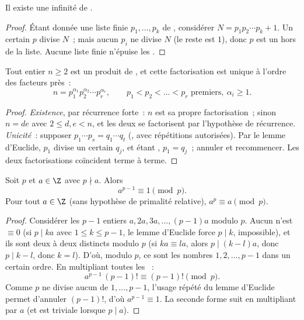 \begin{theorem}[Euclide]\label{thm:g12:arith:infiniteprimes}
Il existe une infinité de .
\end{theorem}

\begin{proof}
Étant donnée une liste finie $p_1, \dots, p_k$ de , considérer
$N = p_1 p_2 \cdots p_k + 1$. Un certain  $p$ divise $N$~; mais aucun
$p_i$ ne divise $N$ (le reste est $1$), donc $p$ est un  hors de la
liste. Aucune liste finie n'épuise les .
\end{proof}

\begin{theorem}\label{thm:g12:arith:fta}
Tout entier $n \geq 2$ est un produit de , et cette factorisation
est unique à l'ordre des facteurs près~:
\[
n = p_1^{\alpha_1} p_2^{\alpha_2} \cdots p_r^{\alpha_r},
\qquad p_1 < p_2 < \dots < p_r \text{ premiers},\ \alpha_i \geq 1 .
\]
\end{theorem}

\begin{proof}
\emph{Existence}, par récurrence forte~: $n$  est sa propre
factorisation~; sinon $n = de$ avec $2 \leq d, e < n$, et les deux se
factorisent par l'hypothèse de récurrence. \emph{Unicité}~: supposer
$p_1\cdots p_s = q_1 \cdots q_t$ (, avec répétitions autorisées).
Par le lemme d'Euclide, $p_1$ divise un certain $q_j$, et étant ,
$p_1 = q_j$~; annuler et recommencer. Les deux factorisations coïncident
terme à terme.
\end{proof}

\begin{theorem}\label{thm:g12:arith:fermat}
Soit $p$  et $a \in \Z$ avec $p \nmid a$. Alors
\[
a^{p-1} \equiv 1 \pmod p .
\]
Pour tout $a \in \Z$ (sans hypothèse de primalité relative),
$a^p \equiv a \pmod p$.
\end{theorem}

\begin{proof}
Considérer les $p - 1$ entiers $a, 2a, 3a, \dots, (p-1)a$ modulo $p$.
Aucun n'est $\equiv 0$ (si $p \mid ka$ avec $1 \leq k \leq p-1$, le lemme
d'Euclide force $p \mid k$, impossible), et ils sont deux à deux distincts
modulo $p$ (si $ka \equiv la$, alors $p \mid (k - l)a$, donc $p \mid k - l$,
donc $k = l$).
D'où, modulo $p$, ce sont les nombres $1, 2, \dots, p-1$ dans un certain
ordre. En multipliant toutes les ~:
\[
a^{p-1}\,(p-1)! \equiv (p-1)! \pmod p .
\]
Comme $p$ ne divise aucun de $1, \dots, p-1$, l'usage répété du lemme
d'Euclide permet d'annuler $(p-1)!$, d'où $a^{p-1} \equiv 1$. La seconde
forme suit en multipliant par $a$ (et est triviale lorsque $p \mid a$).
\end{proof}

